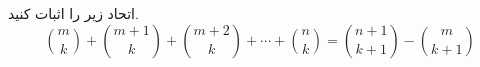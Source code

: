 \p
اتحاد زیر را اثبات کنید.
$$\binom{m}{k} + \binom{m + 1}{k} + \binom{m + 2}{k} + \cdots + \binom{n}{k} = \binom{n + 1}{k + 1} - \binom{m}{k + 1}$$